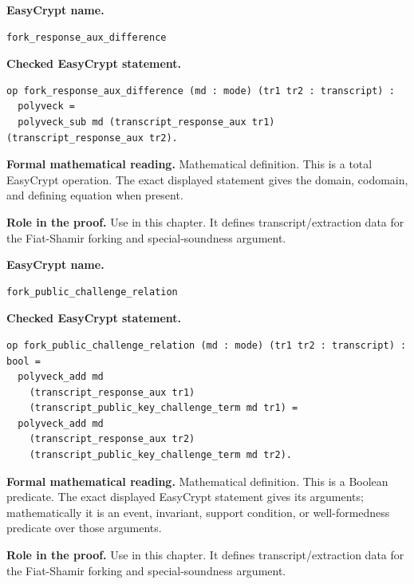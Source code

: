 \begin{formaldefinition}
\noindent\textbf{EasyCrypt name.}
\begin{lstlisting}[language=EasyCrypt,basicstyle=\ttfamily\scriptsize]
fork_response_aux_difference
\end{lstlisting}
\noindent\textbf{Checked EasyCrypt statement.}
\begin{lstlisting}[language=EasyCrypt,basicstyle=\ttfamily\scriptsize]
op fork_response_aux_difference (md : mode) (tr1 tr2 : transcript) :
  polyveck =
  polyveck_sub md (transcript_response_aux tr1) (transcript_response_aux tr2).
\end{lstlisting}
\noindent\textbf{Formal mathematical reading.}
Mathematical definition. This is a total EasyCrypt operation.  The exact displayed statement gives the domain, codomain, and defining equation when present.

\noindent\textbf{Role in the proof.}
Use in this chapter. It defines transcript/extraction data for the Fiat-Shamir forking and special-soundness argument.

\end{formaldefinition}

\begin{formaldefinition}
\noindent\textbf{EasyCrypt name.}
\begin{lstlisting}[language=EasyCrypt,basicstyle=\ttfamily\scriptsize]
fork_public_challenge_relation
\end{lstlisting}
\noindent\textbf{Checked EasyCrypt statement.}
\begin{lstlisting}[language=EasyCrypt,basicstyle=\ttfamily\scriptsize]
op fork_public_challenge_relation (md : mode) (tr1 tr2 : transcript) : bool =
  polyveck_add md
    (transcript_response_aux tr1)
    (transcript_public_key_challenge_term md tr1) =
  polyveck_add md
    (transcript_response_aux tr2)
    (transcript_public_key_challenge_term md tr2).
\end{lstlisting}
\noindent\textbf{Formal mathematical reading.}
Mathematical definition. This is a Boolean predicate.  The exact displayed EasyCrypt statement gives its arguments; mathematically it is an event, invariant, support condition, or well-formedness predicate over those arguments.

\noindent\textbf{Role in the proof.}
Use in this chapter. It defines transcript/extraction data for the Fiat-Shamir forking and special-soundness argument.

\end{formaldefinition}

